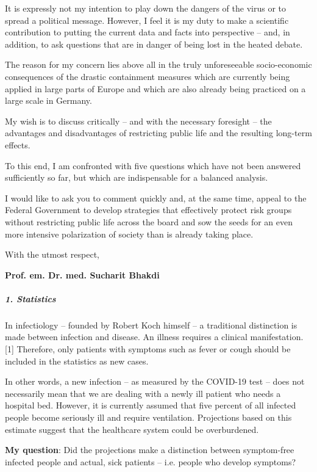 It is expressly not my intention to play down the dangers of the virus
or to spread a political message. However, I feel it is my duty to make
a scientific contribution to putting the current data and facts into
perspective -- and, in addition, to ask questions that are in danger of
being lost in the heated debate.

The reason for my concern lies above all in the truly unforeseeable
socio-economic consequences of the drastic containment measures which
are currently being applied in large parts of Europe and which are also
already being practiced on a large scale in Germany.

My wish is to discuss critically -- and with the necessary foresight --
the advantages and disadvantages of restricting public life and the
resulting long-term effects.

To this end, I am confronted with five questions which have not been
answered sufficiently so far, but which are indispensable for a balanced
analysis.

I would like to ask you to comment quickly and, at the same time, appeal
to the Federal Government to develop strategies that effectively protect
risk groups without restricting public life across the board and sow the
seeds for an even more intensive polarization of society than is already
taking place.

With the utmost respect,

\textbf{Prof. em. Dr. med. Sucharit Bhakdi}

\hypertarget{1-statistics}{%
\subparagraph{\texorpdfstring{\textbf{1.
Statistics}}{1. Statistics}}\label{1-statistics}}

In infectiology -- founded by Robert Koch himself -- a traditional
distinction is made between infection and disease. An illness requires a
clinical manifestation. {[}1{]} Therefore, only patients with symptoms
such as fever or cough should be included in the statistics as new
cases.

In other words, a new infection -- as measured by the COVID-19 test --
does not necessarily mean that we are dealing with a newly ill patient
who needs a hospital bed. However, it is currently assumed that five
percent of all infected people become seriously ill and require
ventilation. Projections based on this estimate suggest that the
healthcare system could be overburdened.

\textbf{My question}: Did the projections make a distinction between
symptom-free infected people and actual, sick patients -- i.e. people
who develop symptoms?

